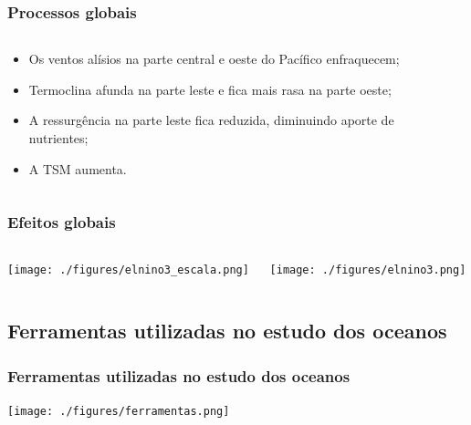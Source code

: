 \begin{frame}
    \frametitle{Processos globais}
    \begin{columns}
        \begin{column}{0.5\textwidth}
            \begin{itemize}[<+-| alert@+>]
                \item Os ventos alísios na parte central e oeste do Pacífico
                      enfraquecem;
                \item Termoclina afunda na parte leste e fica mais rasa na
                      parte oeste;
                \item A ressurgência na parte leste fica reduzida, diminuindo
                      aporte de nutrientes;
                \item A TSM aumenta.
    \end{itemize}
        \end{column}
        \begin{column}{0.3\textwidth}
            \centerline{}
            \centerline{}
        \end{column}
    \end{columns}
\end{frame}

\begin{frame}
    \frametitle{Efeitos globais}
    \begin{columns}
        \begin{column}{0.3\textwidth}
            \centerline{\texttt{[image: ./figures/elnino3\_escala.png]}}
        \end{column}
        \begin{column}{0.7\textwidth}
            \centerline{\texttt{[image: ./figures/elnino3.png]}}
        \end{column}
    \end{columns}
\end{frame}

\subsection{Ferramentas utilizadas no estudo dos oceanos}
\begin{frame}
    \frametitle{Ferramentas utilizadas no estudo dos oceanos}
    \centerline{\texttt{[image: ./figures/ferramentas.png]}}
\end{frame}

